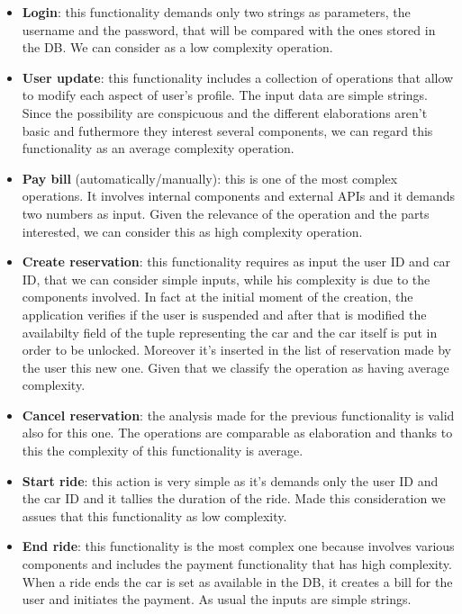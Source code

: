 \documentclass[english]{article}
\begin{document}
\begin{itemize}

	\item{\textbf{Login}: this functionality demands only two strings as parameters, the username and the password, that will be compared with the ones stored in the DB. We can consider as a low complexity operation.}
	
	\item{\textbf{User update}: this functionality includes a collection of operations that allow to modify each aspect of user's profile. The input data are simple strings. Since the possibility are conspicuous and the different elaborations aren't basic and futhermore they interest several components, we can regard this functionality as an average complexity operation.}
	
	\item{\textbf{Pay bill} (automatically/manually): this is one of the most complex operations. It involves internal components and external APIs and it demands two numbers as input. Given the relevance of the operation and the parts interested, we can consider this as high complexity operation.}

	\item{\textbf{Create reservation}: this functionality requires as input the user ID and car ID, that we can consider simple inputs, while his complexity is due to the components involved. In fact at the initial moment of the creation, the application verifies if the user is suspended and after that is modified the availabilty field of the tuple representing the car and the car itself is put in order to be unlocked. Moreover it's inserted in the list of reservation made by the user this new one. Given that we classify the operation as having average complexity.}

	\item{\textbf{Cancel reservation}: the analysis made for the previous functionality is valid also for this one. The operations are comparable as elaboration and thanks to this the complexity of this functionality is average.}

	\item{\textbf{Start ride}: this action is very simple as it's demands only the user ID and the car ID and it tallies the duration of the ride. Made this consideration we assues that this functionality as low complexity.}

	\item{\textbf{End ride}: this functionality is the most complex one because involves various components and includes the payment functionality that has high complexity. When a ride ends the car is set as available in the DB, it creates a bill for the user and initiates the payment. As usual the inputs are simple strings.}


\end{itemize}
\end{document}
